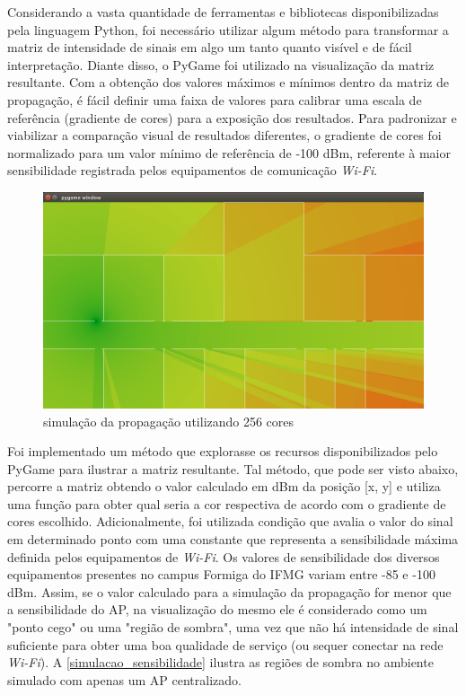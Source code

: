 \documentclass[
	12pt,				%
	openright,			%
	twoside,			%
	a4paper,			%
	english,			%
	french,				%
	spanish,			%
	brazil				%
	]{abntex2}
\begin{document}
Considerando a vasta quantidade de ferramentas e bibliotecas disponibilizadas pela linguagem Python, foi necessário utilizar algum método para transformar a matriz de intensidade de sinais em  algo um tanto quanto visível e de fácil interpretação. Diante disso, o PyGame foi utilizado na visualização da matriz resultante. Com a obtenção dos valores máximos e mínimos dentro da matriz de propagação, é fácil definir uma faixa de valores para calibrar uma escala de referência (gradiente de cores) para a exposição dos resultados. Para padronizar e viabilizar a comparação visual de resultados diferentes, o gradiente de cores foi normalizado para um valor mínimo de referência de -100 dBm, referente à maior sensibilidade registrada pelos equipamentos de comunicação \textit{Wi-Fi}.

\begin{figure}[ht]
	\caption{\label{represetacao_simulacao}simulação da propagação utilizando 256 cores}
	\begin{center}
		\includegraphics[scale=0.4]{images/representacao-simulacao.jpg}
	\end{center}
\end{figure}

Foi implementado um método que explorasse os recursos disponibilizados pelo PyGame para ilustrar a matriz resultante. Tal método, que pode ser visto abaixo, percorre a matriz obtendo o valor calculado em dBm da posição [x, y] e utiliza uma função para obter qual seria a cor respectiva de acordo com o gradiente de cores escolhido. Adicionalmente, foi utilizada condição que avalia o valor do sinal em determinado ponto com uma constante que representa a sensibilidade máxima definida pelos equipamentos de \textit{Wi-Fi}. Os valores de sensibilidade dos diversos equipamentos presentes no campus Formiga do IFMG variam entre -85 e -100 dBm. Assim, se o valor calculado para a simulação da propagação for menor que a sensibilidade do AP, na visualização do mesmo ele é considerado como um "ponto cego" ou uma "região de sombra", uma vez que não há intensidade de sinal suficiente para obter uma boa qualidade de serviço (ou sequer conectar na rede \textit{Wi-Fi}). A \autoref{simulacao_sensibilidade} ilustra as regiões de sombra no ambiente simulado com apenas um AP centralizado. 
\end{document}
